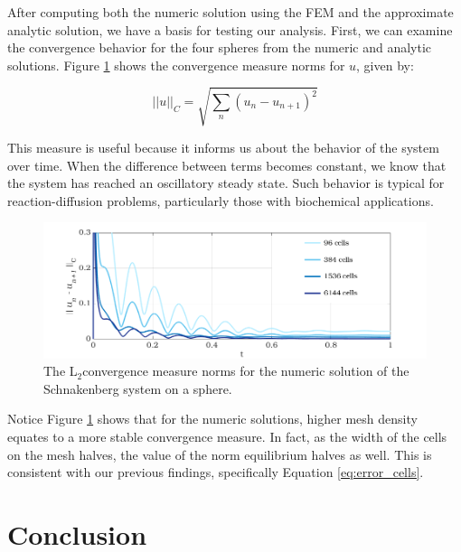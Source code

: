 \documentclass[12pt]{article}
\begin{document}
After computing both the numeric solution using the FEM and the approximate analytic solution, we have a basis for testing our analysis. First, we can examine the convergence behavior for the four spheres from the numeric and analytic solutions. Figure \ref{fig:inner_norms} shows the convergence measure norms for $u$, given by:

$$ ||u||_C = \sqrt{\sum_n (u_{n} - u_{n+1})^2} $$

This measure is useful because it informs us about the behavior of the system over time. When the difference between terms becomes constant, we know that the system has reached an oscillatory steady state. Such behavior is typical for reaction-diffusion problems, particularly those with biochemical applications. 

\begin{figure}[H]
	\includegraphics[width=\linewidth, trim= 1.4cm 0 2cm 0, clip]{norm_numeric.png}
	\caption{The L$_2$convergence measure norms for the numeric solution of the Schnakenberg system on a sphere.}
	\label{fig:inner_norms}
\end{figure}

Notice Figure \ref{fig:inner_norms} shows that for the numeric solutions, higher mesh density equates to a more stable convergence measure. In fact, as the width of the cells on the mesh halves, the value of the norm equilibrium halves as well. This is consistent with our previous findings, specifically Equation \ref{eq:error_cells}.

\section{Conclusion}
\end{document}
